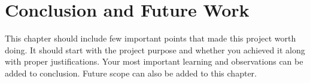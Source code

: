 \chapter{Conclusion and Future Work}
 This chapter should include few important points that made this project worth doing. It should
 start with the project purpose and whether you achieved it along with proper justifications. Your
 most important learning and observations can be added to conclusion.
 Future scope can also be added to this chapter. 